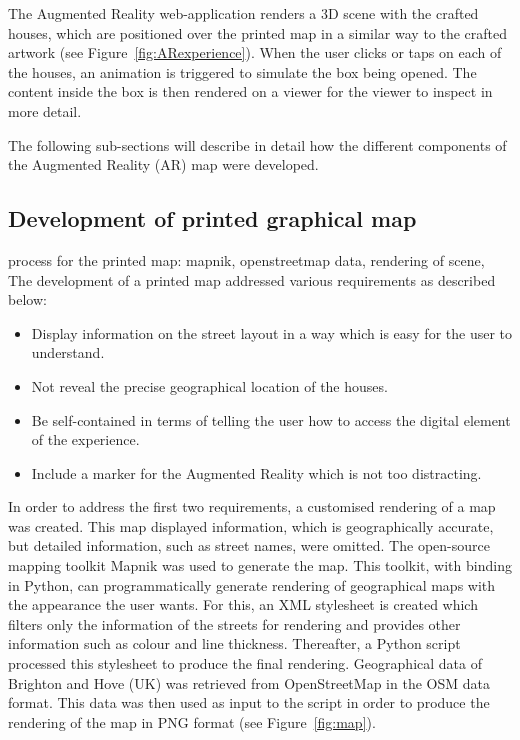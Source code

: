 \documentclass[acmlarge,screen,dvipsnames]{acmart}
\begin{document}
The Augmented Reality web-application renders a 3D scene with the crafted
houses, which are positioned over the printed map in a similar way to the
crafted artwork (see Figure~\ref{fig:ARexperience}). When the user clicks or
taps on each of the houses, an animation is triggered to simulate the box
being opened. The content inside the box is then rendered on a viewer for the
viewer to inspect in more detail. 

The following sub-sections will describe in detail how the different
components of the Augmented Reality (AR) map were developed.

\subsection{Development of printed graphical map} %
process for the printed map: mapnik, openstreetmap data, rendering of scene, 
The development of a printed map addressed various requirements as described
below:

\begin{itemize} 
  \item Display information on the street layout in a way which is easy for the user to understand. 
  \item Not reveal the precise geographical location of the houses. 
  \item Be self-contained in terms of telling the user how to access 
  the digital element of the experience. 
  \item Include a marker for the Augmented Reality which is not too distracting. 
\end{itemize}

In order to address the first two requirements, a customised rendering of a
map was created. This map displayed information, which is geographically
accurate, but detailed information, such as street names, were omitted. The
open-source mapping toolkit Mapnik \cite{mapnik} was used to generate the map.
This toolkit, with binding in Python, can programmatically generate rendering
of geographical maps with the appearance the user wants. For this, an XML
stylesheet is created which filters only the information of the streets for
rendering and provides other information such as colour and line thickness.
Thereafter, a Python script processed this stylesheet to produce the final
rendering. Geographical data of Brighton and Hove (UK) was retrieved from OpenStreetMap
\cite{OpenStreetMap} in the OSM data format. This data was then used as input
to the script in order to produce the rendering of the map in PNG format (see
Figure~\ref{fig:map}).
\end{document}
